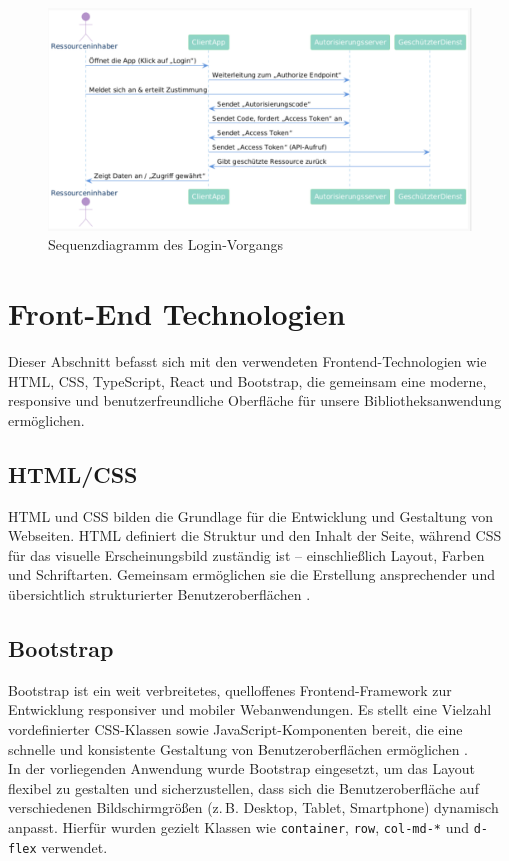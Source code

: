 \begin{figure}[H]
	\centering
	\includegraphics[width=\textwidth]{images/SequenceDiagram.jpg}
	\caption{Sequenzdiagramm des Login-Vorgangs}
	\label{fig:Sequence-Diagram} 
\end{figure}

\section{Front-End Technologien}

Dieser Abschnitt befasst sich mit den verwendeten Frontend-Technologien wie HTML, CSS, TypeScript, React und Bootstrap, die gemeinsam eine moderne, responsive und benutzerfreundliche Oberfläche für unsere Bibliotheksanwendung ermöglichen.

\subsection{HTML/CSS}

HTML und CSS bilden die Grundlage für die Entwicklung und Gestaltung von Webseiten. HTML definiert die Struktur und den Inhalt der Seite, während CSS für das visuelle Erscheinungsbild zuständig ist – einschließlich Layout, Farben und Schriftarten. Gemeinsam ermöglichen sie die Erstellung ansprechender und übersichtlich strukturierter Benutzeroberflächen \cite{HTML/CSS:2024}.

\subsection{Bootstrap}
Bootstrap ist ein weit verbreitetes, quelloffenes Frontend-Framework zur Entwicklung responsiver und mobiler Webanwendungen. Es stellt eine Vielzahl vordefinierter CSS-Klassen sowie JavaScript-Komponenten bereit, die eine schnelle und konsistente Gestaltung von Benutzeroberflächen ermöglichen \cite{bootstrap-docs}. \\
In der vorliegenden Anwendung wurde Bootstrap eingesetzt, um das Layout flexibel zu gestalten und sicherzustellen, dass sich die Benutzeroberfläche auf verschiedenen Bildschirmgrößen (z.\,B. Desktop, Tablet, Smartphone) dynamisch anpasst. Hierfür wurden gezielt Klassen wie \texttt{container}, \texttt{row}, \texttt{col-md-*} und \texttt{d-flex} verwendet.


